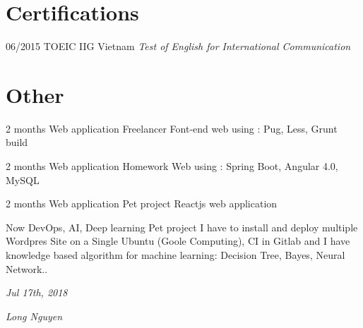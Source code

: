 \documentclass[]{friggeri-cv}
\begin{document}
\section{Certifications}
\begin{entrylist}
  \entry
    {06/2015}
    {TOEIC}
    {IIG Vietnam}
    {\emph{Test of English for International Communication}}
\end{entrylist}
\section{Other}

\begin{entrylist}
	\entry
	    {2 months}
		{Web application}
		{Freelancer}
		{Font-end web using : Pug, Less, Grunt build}
\end{entrylist}
\begin{entrylist}
	\entry
		{2 months}
		{Web application}
		{Homework}
		{Web using : Spring Boot, Angular 4.0, MySQL}
\end{entrylist}
\begin{entrylist}
	\entry
		{2 months}
		{Web application}
		{Pet project}
		{Reactjs web application}
\end{entrylist}
\begin{entrylist}
	\entry
	{Now}
	{DevOps, AI, Deep learning}
	{Pet project}
	{I have to install and deploy multiple Wordpres Site on a Single Ubuntu (Goole Computing), CI in Gitlab and I have knowledge based algorithm for machine learning: Decision Tree, Bayes, Neural Network.. }
\end{entrylist}
\begin{flushleft}
\emph{Jul 17th, 2018}
\end{flushleft}
\begin{flushright}
\emph{Long Nguyen}
\end{flushright}
\end{document}
